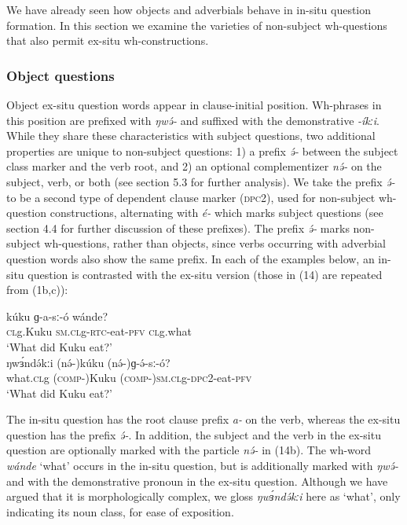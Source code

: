 We have already seen how objects and adverbials behave in in-situ question formation. In this section we examine the varieties of non-subject wh-questions that also permit ex-situ wh-constructions. 

\subsubsection{Object questions}
Object ex-situ question words appear in clause-initial position. Wh-phrases in this position are prefixed with \textit{ŋwə́-} and suffixed with the demonstrative \textit{-íkːi}. While they share these characteristics with subject questions, two additional properties are unique to non-subject questions: 1) a prefix \textit{ə́-} between the subject class marker and the verb root, and 2) an optional complementizer \textit{nə́-} on the subject, verb, or both (see section 5.3 for further analysis). We take the prefix \textit{ə́-} to be a second type of dependent clause marker (\textsc{dpc}2), used for non-subject wh-question constructions, alternating with \textit{é-} which marks subject questions (see section 4.4 for further discussion of these prefixes). The prefix \textit{ə́-} marks non-subject wh-questions, rather than objects, since verbs occurring with adverbial question words also show the same prefix. In each of the examples below, an in-situ question is contrasted with the ex-situ version (those in (14) are repeated from (1b,c)): 

\ea
\ea \gll	kúku	ɡ-a-sː-ó	wánde?\\
	\textsc{cl}g.Kuku	\textsc{sm.cl}g-\textsc{rtc}-eat-\textsc{pfv}   	\textsc{cl}g.what\\
\trans	‘What did Kuku eat?’\\
\ex \gll	ŋwɜ́ndə́kːi	(nə́-)kúku     	(nə́-)ɡ-ə́-sː-ó?                \\
	what.\textsc{cl}g	(\textsc{comp-})Kuku  	(\textsc{comp-})\textsc{sm.cl}g-\textsc{dpc}2-eat-\textsc{pfv}  \\
\trans	‘What did Kuku eat?’\\
\z
\z

The in-situ question has the root clause prefix \textit{a-} on the verb, whereas the ex-situ question has the prefix \textit{ə́-}. In addition, the subject and the verb in the ex-situ question are optionally marked with the particle \textit{nə́-} in (14b). The wh-word \textit{wánde} ‘what’ occurs in the in-situ question, but is additionally marked with \textit{ŋwə́-} and with the demonstrative pronoun in the ex-situ question. Although we have argued that it is morphologically complex, we gloss \textit{ŋwɜ́ndə́kːi} here as ‘what’, only indicating its noun class, for ease of exposition.

